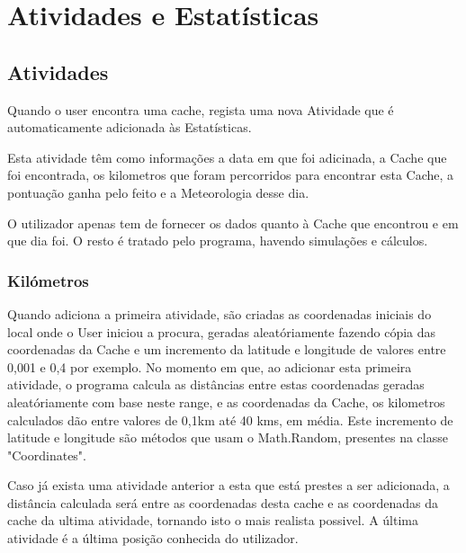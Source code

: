 \documentclass{article}
\begin{document}
\section{Atividades e Estatísticas}

\subsection{Atividades}
\quad Quando o user encontra uma cache, regista uma nova Atividade que é automaticamente adicionada às Estatísticas.
\par Esta atividade têm como informações a data em que foi adicinada, a Cache que foi encontrada, os kilometros que foram percorridos para encontrar esta Cache, a pontuação ganha pelo feito e a Meteorologia desse dia.
\par O utilizador apenas tem de fornecer os dados quanto à Cache que encontrou e em que dia foi. O resto é tratado pelo programa, havendo simulações e cálculos.

\subsubsection{Kilómetros}
\quad  Quando adiciona a primeira atividade, são criadas as coordenadas iniciais do local onde o User iniciou a procura, geradas aleatóriamente fazendo cópia das coordenadas da Cache e um incremento da latitude e longitude de valores entre 0,001 e 0,4 por exemplo. No momento em que, ao adicionar esta primeira atividade, o programa calcula as distâncias entre estas coordenadas geradas aleatóriamente com base neste range, e as coordenadas da Cache, os kilometros calculados dão entre valores de 0,1km até 40 kms, em média.
Este incremento de latitude e longitude são métodos que usam o Math.Random, presentes na classe "Coordinates".
\par Caso já exista uma atividade anterior a esta que está prestes a ser adicionada, a distância calculada será entre as coordenadas desta cache e as coordenadas da cache da ultima atividade, tornando isto o mais realista possivel. A última atividade é a última posição conhecida do utilizador.
\\
\end{document}
